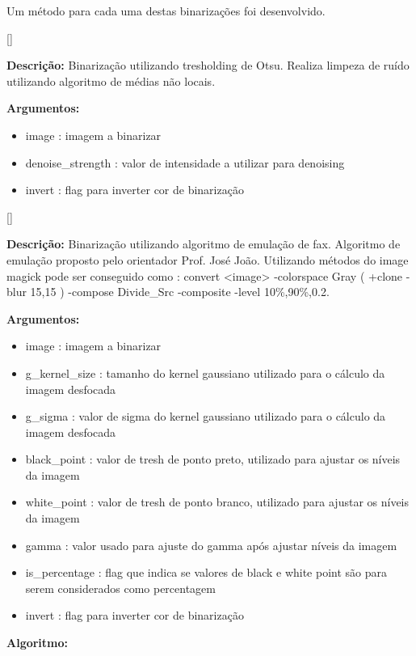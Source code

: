 Um método para cada uma destas binarizações foi desenvolvido.

[\normalsize]

\textbf{Descrição:} Binarização utilizando tresholding de Otsu. Realiza limpeza de ruído utilizando algoritmo de médias não locais.

\textbf{Argumentos:}
\begin{itemize}\setlength\itemsep{-0.3em}
	\vspace{-0.5em}
	\item image : imagem a binarizar
	\item denoise\_strength : valor de intensidade a utilizar para denoising
	\item invert : flag para inverter cor de binarização
\end{itemize}

[\normalsize]

\textbf{Descrição:} Binarização utilizando algoritmo de emulação de fax. Algoritmo de emulação proposto pelo orientador Prof. José João. Utilizando métodos do image magick pode ser conseguido como : convert <image> -colorspace Gray ( +clone -blur 15,15 ) -compose Divide\_Src -composite -level 10\%,90\%,0.2.


\textbf{Argumentos:}
\begin{itemize}\setlength\itemsep{-0.3em}
	\vspace{-0.5em}
	\item image : imagem a binarizar
	\item g\_kernel\_size : tamanho do kernel gaussiano utilizado para o cálculo da imagem desfocada
	\item g\_sigma : valor de sigma do kernel gaussiano utilizado para o cálculo da imagem desfocada
	\item black\_point : valor de tresh de ponto preto, utilizado para ajustar os níveis da imagem
	\item white\_point : valor de tresh de ponto branco, utilizado para ajustar os níveis da imagem 
	\item gamma : valor usado para ajuste do gamma após ajustar níveis da imagem
	\item is\_percentage : flag que indica se valores de black e white point são para serem considerados como percentagem
	\item invert : flag para inverter cor de binarização
\end{itemize}

\textbf{Algoritmo:}

